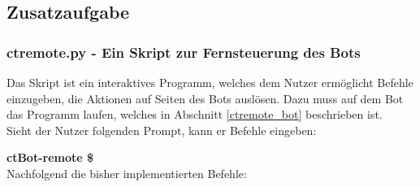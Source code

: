 \subsection{Zusatzaufgabe}

\subsubsection{ctremote.py - Ein Skript zur Fernsteuerung des Bots}
\label{ctremote}
Das Skript ist ein interaktives Programm, welches dem Nutzer ermöglicht Befehle einzugeben, die Aktionen auf Seiten des Bots auslösen. Dazu muss auf dem Bot das Programm laufen, welches in Abschnitt \ref{ctremote_bot} beschrieben ist.\\
Sieht der Nutzer folgenden Prompt, kann er Befehle eingeben:

\textbf{ctBot-remote \$}\\
Nachfolgend die bisher implementierten Befehle:
